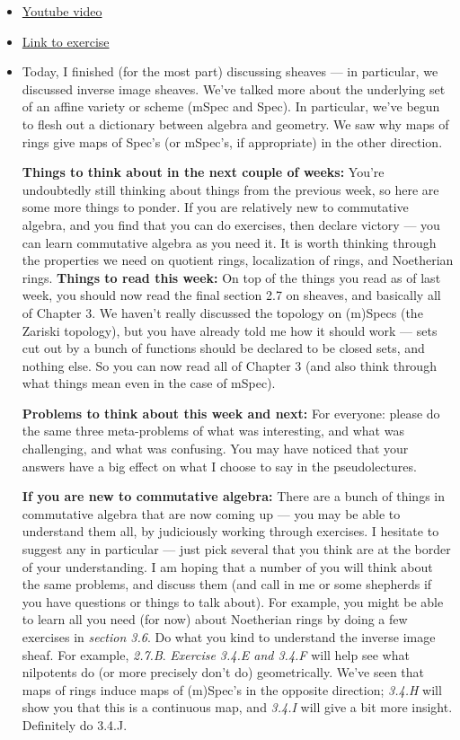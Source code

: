 \documentclass{book}
\theoremstyle{definition}
\begin{document}
\begin{itemize}
    \item \href{https://www.youtube.com/watch?v=zS3I4KKmtW0}{Youtube video}
    \item \href{https://math216.wordpress.com/2020/07/25/between-pseudolectures-5-and-6/}{Link to exercise}
    \item 
    Today, I finished (for the most part) discussing sheaves — in particular, we discussed inverse image sheaves. We’ve talked more about the underlying set of an affine variety or scheme (mSpec and Spec). In particular, we’ve begun to flesh out a dictionary between algebra and geometry. We saw why maps of rings give maps of Spec’s (or mSpec’s, if appropriate) in the other direction.

	\textbf{Things to think about in the next couple of weeks:}
	You’re undoubtedly still thinking about things from the previous week, so here are some more things to ponder. If you are relatively new to commutative algebra, and you find that you can do exercises, then declare victory — you can learn commutative algebra as you need it. It is worth thinking through the properties we need on quotient rings, localization of rings, and Noetherian rings.
	\textbf{Things to read this week:}
	On top of the things you read as of last week, you should now read the final section 2.7 on sheaves, and basically all of Chapter 3. We haven’t really discussed the topology on (m)Specs (the Zariski topology), but you have already told me how it should work --- sets cut out by a bunch of functions should be declared to be closed sets, and nothing else. So you can now read all of Chapter 3 (and also think through what things mean even in the case of mSpec).

	\textbf{Problems to think about this week and next:}
	For everyone: please do the same three meta-problems of what was interesting, and what was challenging, and what was confusing.
	You may have noticed that your answers have a big effect on what I choose to say in the pseudolectures.

    \textbf{If you are new to commutative algebra:} There are a bunch of things in
    commutative algebra that are now coming up --- you may be able to
    understand them all, by judiciously working through exercises. I
    hesitate to suggest any in particular --- just pick several that you
    think are at the border of your understanding. I am hoping that a
    number of you will think about the same problems, and discuss them (and
    call in me or some shepherds if you have questions or things to talk
    about). For example, you might be able to learn all you need (for now)
    about Noetherian rings by doing a few exercises in \emph{section 3.6}.
    Do what you kind to understand the inverse image sheaf. For example, \emph{2.7.B}.
    \emph{Exercise 3.4.E and 3.4.F} will help see what nilpotents do (or more
    precisely don’t do) geometrically. We’ve seen that maps of rings induce
    maps of (m)Spec’s in the opposite direction; \emph{3.4.H} will show you that
    this is a continuous map, and \emph{3.4.I} will give a bit more insight.
    Definitely do 3.4.J.


\end{itemize}
\end{document}
